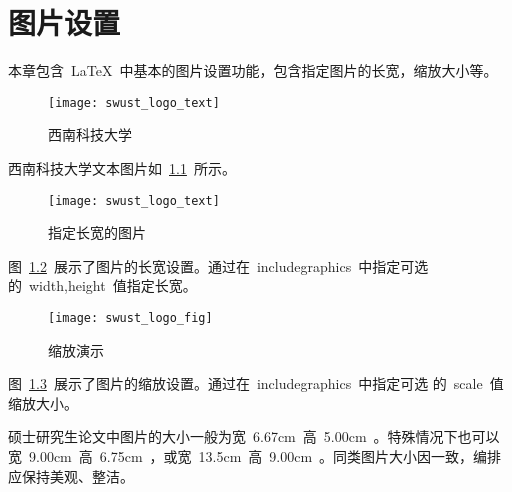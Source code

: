 \chapter{图片设置}

本章包含~\LaTeX~中基本的图片设置功能，包含指定图片的长宽，缩放大小等。

\begin{figure}[ht]
  \centering
  \texttt{[image: swust\_logo\_text]}
  \caption{西南科技大学}\label{fig:swust_logo_text}
\end{figure}
西南科技大学文本图片如~\ref{fig:swust_logo_text}~所示。

\begin{figure}[ht]
  \centering
  \texttt{[image: swust\_logo\_text]}
  \caption{指定长宽的图片}\label{fig:swust_logo_text1}
\end{figure}
图~\ref{fig:swust_logo_text1}~展示了图片的长宽设置。通过在~includegraphics~中指定可选
的~width,height~值指定长宽。

\begin{figure}[ht]
  \centering
  \texttt{[image: swust\_logo\_fig]}
  \caption{缩放演示}\label{fig:swust_logo_fig}
\end{figure}

图~\ref{fig:swust_logo_fig}~展示了图片的缩放设置。通过在~includegraphics~中指定可选
的~scale~值缩放大小。

硕士研究生论文中图片的大小一般为宽~6.67cm~高~5.00cm~。特殊情况下也可以
宽~9.00cm~高~6.75cm~，或宽~13.5cm~高~9.00cm~。同类图片大小因一致，编排
应保持美观、整洁。
